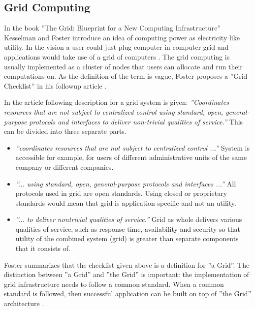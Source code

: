 \documentclass{tktltiki}
\begin{document}
\subsection{Grid Computing}

In the book ''The Grid: Blueprint for a New Computing Infrastructure'' Kesselman and Foster introduce an idea of computing power as electricity like utility.  In the vision a user could just plug computer in computer grid and applications would take use of a grid  of computers \cite{TheGrid08}. The grid computing is usually implemented as a cluster of nodes that users can allocate and run their computations on.   As the definition of the term is vague, Foster proposes a ''Grid Checklist'' in his followup article \cite{WhatIsGrid02}.

In the article following description for a grid system is given: \emph{''Coordinates resources that are not subject to centralized control using standard, open, general-purpose protocols and interfaces to deliver non-trivial qualities of service.''}  This can be divided into three separate parts.

\begin{itemize}
	\item{\emph{''coordinates resources that are not subject to centralized control ...''}
System is accessible for example, for users of different administrative units of the same company or different companies.}
	\item{\emph{''... using standard, open, general-purpose protocols and interfaces ...''}
All protocols used in grid are open standards. Using closed or proprietary standards would mean that grid is application specific and not an utility.
}
	\item{\emph{''... to deliver nontrivial qualities of service.''}
Grid as whole delivers various qualities of service, such as response time, availability and security so that utility of the combined system (grid) is greater than separate components that it consists of.
}

\end{itemize}


Foster summarizes that the checklist given above is a definition for ''a Grid''.  The distinction between ''a Grid'' and ''the Grid'' is important: the implementation of grid infrastructure needs to follow a common standard.  When a common standard is followed, then successful application can be built on top of ''the Grid'' architecture \cite{WhatIsGrid02}.
\end{document}
